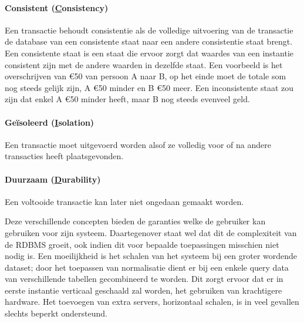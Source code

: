 \paragraph{Consistent (\underline{C}onsistency)} Een transactie behoudt consistentie als de volledige uitvoering van de transactie de database van een consistente staat naar een andere consistentie staat brengt. Een consistente staat is een staat die ervoor zorgt dat waardes van een instantie consistent zijn met de andere waarden in dezelfde staat. Een voorbeeld is het overschrijven van \euro{50} van persoon A naar B, op het einde moet de totale som nog steeds gelijk zijn, A \euro{50} minder en B \euro{50} meer. Een inconsistente staat zou zijn dat enkel A \euro{50} minder heeft, maar B nog steeds evenveel geld. 

\paragraph{Geïsoleerd (\underline{I}solation)} Een transactie moet uitgevoerd worden alsof ze volledig voor of na andere transacties heeft plaatsgevonden. 

\paragraph{Duurzaam (\underline{D}urability)} Een voltooide transactie kan later niet ongedaan gemaakt worden.

Deze verschillende concepten bieden de garanties welke de gebruiker kan gebruiken voor zijn systeem. Daartegenover staat wel dat dit de complexiteit van de RDBMS groeit, ook indien dit voor bepaalde toepassingen misschien niet nodig is. Een moeilijkheid is het schalen van het systeem bij een groter wordende dataset; door het toepassen van normalisatie dient er bij een enkele query data van verschillende tabellen gecombineerd te worden. Dit zorgt ervoor dat er in eerste instantie verticaal geschaald zal worden, het gebruiken van krachtigere hardware. Het toevoegen van extra servers, horizontaal schalen, is in veel gevallen slechts beperkt ondersteund. 


